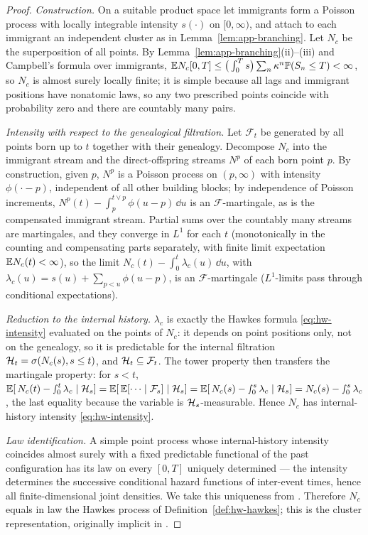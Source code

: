 \begin{proof}
\emph{Construction.} On a suitable product space let immigrants form a Poisson process with locally
integrable intensity $s(\cdot)$ on $[0,\infty)$, and attach to each immigrant an independent cluster
as in Lemma~\ref{lem:app-branching}. Let $N_c$ be the superposition of all points. By
Lemma~\ref{lem:app-branching}(ii)--(iii) and Campbell's formula over immigrants, $\mathbb{E} N_c[0,T] \le
\big(\int_0^T s\big) \sum_n \kappa^n \mathbb{P}(S_n \le T) < \infty$, so $N_c$ is almost surely locally
finite; it is simple because all lags and immigrant positions have nonatomic laws, so any two
prescribed points coincide with probability zero and there are countably many pairs.

\emph{Intensity with respect to the genealogical filtration.} Let $\mathcal{F}_t$ be generated by
all points born up to $t$ together with their genealogy. Decompose $N_c$ into the immigrant stream
and the direct-offspring streams $N^p$ of each born point $p$. By construction, given $p$, $N^p$ is
a Poisson process on $(p, \infty)$ with intensity $\phi(\cdot - p)$, independent of all other
building blocks; by independence of Poisson increments, $N^p(t) - \int_p^{t \vee p} \phi(u - p)\,
\dd u$ is an $\mathcal{F}$-martingale, as is the compensated immigrant stream. Partial sums over the
countably many streams are martingales, and they converge in $L^1$ for each $t$ (monotonically in
the counting and compensating parts separately, with finite limit expectation $\mathbb{E} N_c(t) < \infty$),
so the limit $N_c(t) - \int_0^t \lambda_c(u)\, \dd u$, with $\lambda_c(u) = s(u) + \sum_{p < u}
\phi(u - p)$, is an $\mathcal{F}$-martingale ($L^1$-limits pass through conditional expectations).

\emph{Reduction to the internal history.} $\lambda_c$ is exactly the Hawkes formula
\eqref{eq:hw-intensity} evaluated on the points of $N_c$: it depends on point positions only, not on
the genealogy, so it is predictable for the internal filtration $\mathcal{H}_t = \sigma(N_c(s), s \le t)$,
and $\mathcal{H}_t \subseteq \mathcal{F}_t$. The tower property then transfers the martingale property:
for $s < t$, $\mathbb{E}[\,N_c(t) - \smallint_0^t \lambda_c \mid \mathcal{H}_s] = \mathbb{E}[\,\mathbb{E}[\cdots \mid
\mathcal{F}_s] \mid \mathcal{H}_s] = \mathbb{E}[\,N_c(s) - \smallint_0^s \lambda_c \mid \mathcal{H}_s] = N_c(s) -
\smallint_0^s \lambda_c$, the last equality because the variable is $\mathcal{H}_s$-measurable. Hence
$N_c$ has internal-history intensity \eqref{eq:hw-intensity}.

\emph{Law identification.} A simple point process whose internal-history intensity coincides almost
surely with a fixed predictable functional of the past configuration has its law on every $[0,T]$
uniquely determined --- the intensity determines the successive conditional hazard functions of
inter-event times, hence all finite-dimensional joint densities. We take this uniqueness from
\cite[Ch.~7.2--7.3]{daley2003}. Therefore $N_c$ equals in law the Hawkes process of
Definition~\ref{def:hw-hawkes}; this is the cluster representation, originally implicit in
\cite{hawkes1971}.


\end{proof}
